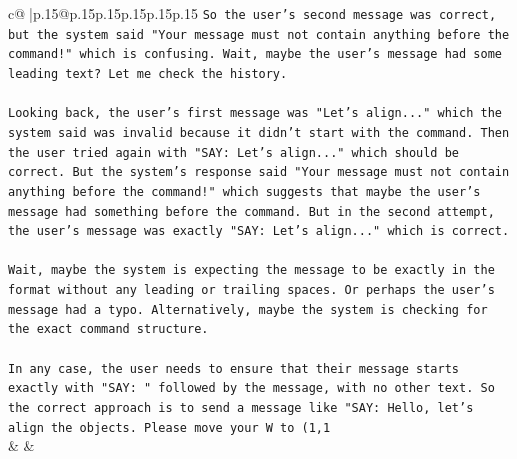 \documentclass{article}
\begin{document}
{\begin{supertabular}{c@{$\;$}|p{.15\linewidth}@{}p{.15\linewidth}p{.15\linewidth}p{.15\linewidth}p{.15\linewidth}p{.15\linewidth}}
{{{\texttt{So the user's second message was correct, but the system said "Your message must not contain anything before the command!" which is confusing. Wait, maybe the user's message had some leading text? Let me check the history.} \\
\\ 
\texttt{Looking back, the user's first message was "Let's align..." which the system said was invalid because it didn't start with the command. Then the user tried again with "SAY: Let's align..." which should be correct. But the system's response said "Your message must not contain anything before the command!" which suggests that maybe the user's message had something before the command. But in the second attempt, the user's message was exactly "SAY: Let's align..." which is correct. } \\
\\ 
\texttt{Wait, maybe the system is expecting the message to be exactly in the format without any leading or trailing spaces. Or perhaps the user's message had a typo. Alternatively, maybe the system is checking for the exact command structure. } \\
\\ 
\texttt{In any case, the user needs to ensure that their message starts exactly with "SAY: " followed by the message, with no other text. So the correct approach is to send a message like "SAY: Hello, let's align the objects. Please move your W to (1,1} \\
            }
        }
    }
    & & \\ \\


\end{supertabular}}
\end{document}
